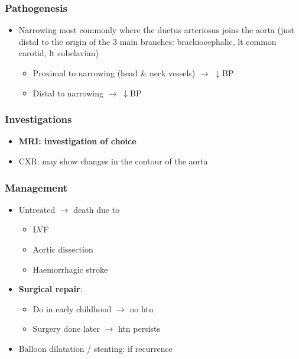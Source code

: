 \documentclass[
  12pt,
]{memoir}
\providecommand{\tightlist}{%
  \setlength{\itemsep}{0pt}\setlength{\parskip}{0pt}}
\begin{document}
\hypertarget{pathogenesis-4}{%
\subsubsection{Pathogenesis}\label{pathogenesis-4}}

\begin{itemize}
\tightlist
\item
  Narrowing most commonly where the ductus arteriosus joins the aorta
  (just distal to the origin of the 3 main branches: brachiocephalic, lt
  common carotid, lt subclavian)

  \begin{itemize}
  \tightlist
  \item
    Proximal to narrowing (head \& neck vessels) \(\rightarrow\)
    \(\downarrow\)BP
  \item
    Distal to narrowing \(\rightarrow\;\downarrow\)BP
  \end{itemize}
\end{itemize}

\hypertarget{investigations-7}{%
\subsubsection{Investigations}\label{investigations-7}}

\begin{itemize}
\tightlist
\item
  \textbf{MRI: investigation of choice}
\item
  CXR: may show changes in the contour of the aorta
\end{itemize}

\hypertarget{management-9}{%
\subsubsection{Management}\label{management-9}}

\begin{itemize}
\tightlist
\item
  Untreated \(\rightarrow\) death due to

  \begin{itemize}
  \tightlist
  \item
    LVF
  \item
    Aortic dissection
  \item
    Haemorrhagic stroke
  \end{itemize}
\item
  \textbf{Surgical repair}:

  \begin{itemize}
  \tightlist
  \item
    Do in early childhood \(\rightarrow\) no htn
  \item
    Surgery done later \(\rightarrow\) htn persists
  \end{itemize}
\item
  Balloon dilatation / stenting: if recurrence
\end{itemize}
\end{document}

